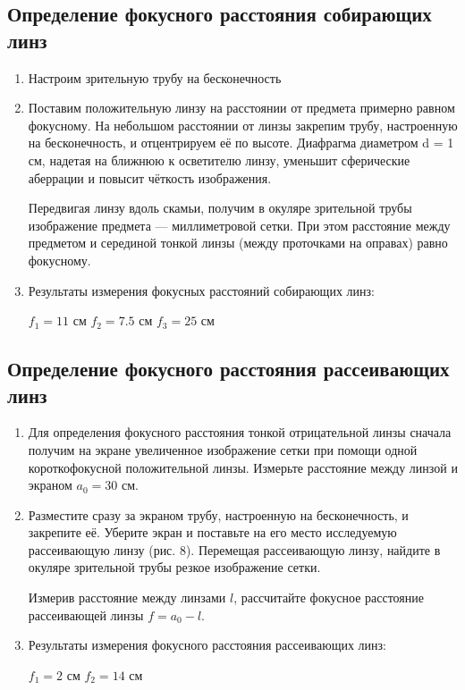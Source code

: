 \documentclass[a4paper]{article}
\begin{document}
\subsection{Определение фокусного расстояния собирающих линз}

\begin{enumerate}
    \item Настроим зрительную трубу на бесконечность
    \item Поставим положительную линзу на
расстоянии от предмета примерно равном фокусному. На небольшом расстоянии от линзы закрепим трубу, настроенную на бесконечность,
и отцентрируем её по высоте. Диафрагма диаметром
d = 1 см, надетая на ближнюю к осветителю линзу, уменьшит сферические аберрации и повысит чёткость изображения. \par
Передвигая линзу вдоль скамьи, получим в окуляре зрительной трубы изображение предмета
— миллиметровой сетки. При этом расстояние между предметом и серединой тонкой линзы (между проточками на оправах) равно фокусному.
    \item Результаты измерения фокусных расстояний собирающих линз:
    \begin{center}
        $f_1 = 11$ см \hspace{1cm}  $f_2 = 7.5$ см \hspace{1cm}  $f_3 = 25$ см
    \end{center}
\end{enumerate}

\subsection{Определение фокусного расстояния рассеивающих линз}
\begin{enumerate}
    \item Для определения фокусного расстояния тонкой отрицательной линзы сначала получим на экране увеличенное изображение сетки при помощи одной короткофокусной положительной линзы. Измерьте расстояние между линзой и экраном $a_0 = 30$ см.
    \item Разместите сразу за экраном трубу, настроенную на бесконечность, и закрепите её. Уберите экран и поставьте на его место исследуемую рассеивающую линзу (рис. 8). Перемещая рассеивающую линзу, найдите в окуляре зрительной трубы резкое изображение сетки. \par
    Измерив расстояние между линзами $l$, рассчитайте фокусное расстояние рассеивающей линзы $f = a_0 - l$.
    \item Результаты измерения фокусного расстояния рассеивающих линз:
    \begin{center}
        $f_1 = 2$ см \hspace{1cm}  $f_2 = 14$ см
    \end{center}
\end{enumerate}
\end{document}
